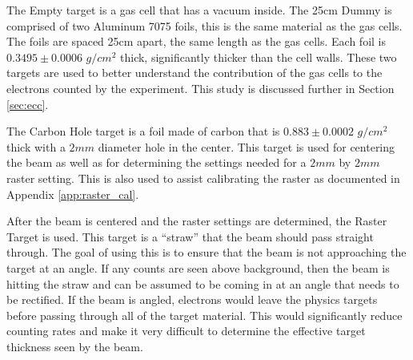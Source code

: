 
The Empty target is a gas cell that has a vacuum inside. The 25cm Dummy is comprised of two Aluminum 7075 foils, this is the same material as the gas cells. The foils are spaced 25cm apart, the same length as the gas cells.  Each foil is $0.3495\pm0.0006$ $g/cm^2$ thick, significantly thicker than the cell walls. These two targets are used to better understand the contribution of the gas cells to the electrons counted by the experiment. This study is discussed further in Section \ref{sec:ecc}.

The Carbon Hole target is a foil made of carbon that is $0.883\pm0.0002$ $g/cm^2$ thick with a $2mm$ diameter hole in the center. This target is used for centering the beam as well as for determining the settings needed for a $2mm$ by $2mm$ raster setting. This is also used to assist calibrating the raster as documented in Appendix \ref{app:raster_cal}.

After the beam is centered and the raster settings are determined, the Raster Target is used. This target is a ``straw'' that the beam should pass straight through. The goal of using this is to ensure that the beam is not approaching the target at an angle. If any counts are seen above background, then the beam is hitting the straw and can be assumed to be coming in at an angle that needs to be rectified. If the beam is angled, electrons would leave the physics targets before passing through all of the target material. This would significantly reduce counting rates and make it very difficult to determine the effective target thickness seen by the beam.
